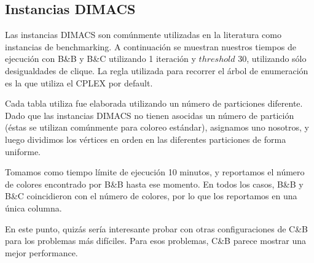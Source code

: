 \subsection{Instancias DIMACS}

Las instancias DIMACS son comúnmente utilizadas en la literatura como instancias de benchmarking. A continuación se muestran nuestros tiempos de ejecución con B\&B y B\&C utilizando 1 iteración y $threshold$ 30, utilizando sólo desigualdades de clique. La regla utilizada para recorrer el árbol de enumeración es la que utiliza el CPLEX por default.

Cada tabla utiliza fue elaborada utilizando un número de particiones diferente. Dado que las instancias DIMACS no tienen asocidas un número de partición (éstas se utilizan comúnmente para coloreo estándar), asignamos uno nosotros, y luego dividimos los vértices en orden en las diferentes particiones de forma uniforme.

Tomamos como tiempo límite de ejecución 10 minutos, y reportamos el número de colores encontrado por B\&B hasta ese momento. En todos los casos, B\&B y B\&C coincidieron con el número de colores, por lo que los reportamos en una única columna.

En este punto, quizás sería interesante probar con otras configuraciones de C\&B para los problemas más difíciles. Para esos problemas, C\&B parece mostrar una mejor performance.


